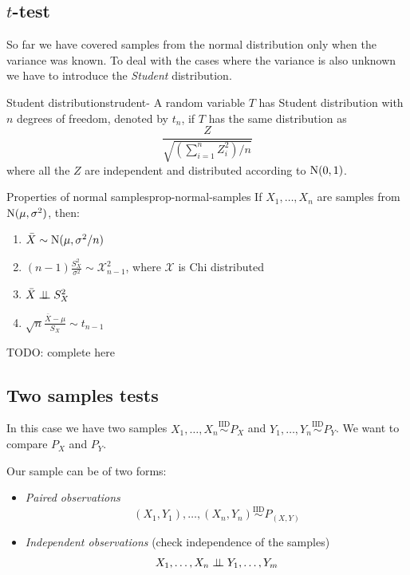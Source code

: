 \documentclass[12pt]{extarticle}
\newcommand{\Normal}{{\operatorfont N}}
\begin{document}
\subsection{\texorpdfstring{$t$}{t}-test}

So far we have covered samples from the normal distribution only when the variance was known.
To deal with the cases where the variance is also unknown we have to introduce the \emph{Student} distribution.

\begin{definition}{Student distribution}{strudent-}
	A random variable $T$ has Student distribution with $n$ degrees of freedom, denoted by $t_n$, if $T$ has the same distribution as
	\begin{equation}
		\frac{Z}{\sqrt{(\sum^n_{i=1} Z_i^2)/n}}
	\end{equation}
	where all the $Z$ are independent and distributed according to $\Normal(0,1)$.
\end{definition}

\begin{theorem}{Properties of normal samples}{prop-normal-samples}
	If $X_1, \dots, X_n$ are samples from $\Normal(\mu, \sigma^2)$, then:
	\begin{enumerate}[label=\roman*.]
		\item $\bar X \sim \Normal(\mu, \sigma^2/n)$
		\item $(n-1)\frac{S_X^2}{\sigma^2} \sim \mathcal X^2_{n-1}$, where $\mathcal X$ is Chi distributed
		\item $\bar X \perp \!\!\! \perp S_X^2$
		\item $\sqrt n \frac{\bar X - \mu}{S_X} \sim t_{n-1}$
	\end{enumerate}
\end{theorem}

TODO: complete here

\subsection{Two samples tests}

In this case we have two samples
$X_1, \dots, X_n \stackrel{\text{IID}}{\sim}P_X$ and
$Y_1, \dots, Y_n \stackrel{\text{IID}}{\sim}P_Y$.
We want to compare $P_X$ and $P_Y$.

Our sample can be of two forms:
\begin{itemize}
	\item \emph{Paired observations}
	      \begin{equation}
		      (X_1, Y_1), \dots, (X_n, Y_n) \stackrel{\text{IID}}{\sim} P_{(X, Y)}
	      \end{equation}
	\item \emph{Independent observations} (check independence of the samples)
	      \begin{equation}
		      X_1, \dots, X_n \perp \!\!\! \perp Y_1, \dots, Y_m
	      \end{equation}
\end{itemize}
\end{document}
